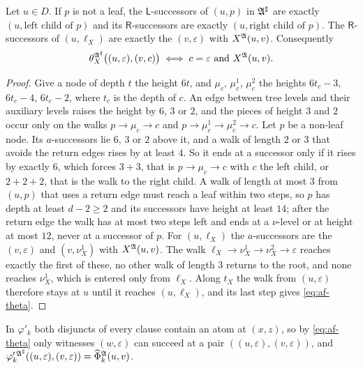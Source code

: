 \begin{lemma}\label{lem:af-steps}
Let $u\in D$. If $p$ is not a leaf, the $\mathsf L$-successors of $(u,p)$ in
$\mathfrak A^\sharp$ are exactly $(u,\text{left child of }p)$ and its
$\mathsf R$-successors are exactly $(u,\text{right child of }p)$. The
$\mathsf R$-successors of $(u,\ell_X)$ are exactly the $(v,\varepsilon)$ with
$X^{\mathfrak A}(u,v)$. Consequently
\begin{equation}\label{eq:af-theta}
 \theta_X^{\mathfrak A^\sharp}\bigl((u,\varepsilon),(v,c)\bigr)\iff c=\varepsilon\
 \text{and}\ X^{\mathfrak A}(u,v).
\end{equation}
\end{lemma}
\begin{proof}
Give a node of depth $t$ the height $6t$, and $\mu_c$, $\mu^1_c$,
$\mu^2_c$ the heights $6t_c-3$, $6t_c-4$, $6t_c-2$, where $t_c$ is the
depth of $c$. An edge between tree levels and their auxiliary levels
raises the height by $6$, $3$ or $2$, and the pieces of height $3$ and $2$
occur only on the walks $p\to\mu_c\to c$ and
$p\to\mu^1_c\to\mu^2_c\to c$. Let $p$ be a non-leaf node. Its
$a$-successors lie $6$, $3$ or $2$ above it, and a walk of length $2$ or
$3$ that avoids the return edges rises by at least $4$. So it ends at a
successor only if it rises by exactly $6$, which forces $3+3$, that is
$p\to\mu_c\to c$ with $c$ the left child, or $2+2+2$, that is the walk to
the right child. A walk of length at most $3$ from $(u,p)$ that uses a
return edge must reach a leaf within two steps, so $p$ has depth at least
$d-2\ge2$ and its successors have height at least $14$; after the return
edge the walk has at most two steps left and ends at a $\nu$-level or at
height at most $12$, never at a successor of $p$. For $(u,\ell_X)$ the
$a$-successors are the $(v,\varepsilon)$ and $(v,\nu^1_X)$ with
$X^{\mathfrak A}(u,v)$. The walk $\ell_X\to\nu^1_X\to\nu^2_X\to\varepsilon$ reaches exactly the first of these,
no other walk of length $3$ returns to the root, and none reaches
$\nu^1_X$, which is entered only from $\ell_X$. Along $t_X$ the walk from
$(u,\varepsilon)$ therefore stays at $u$ until it reaches $(u,\ell_X)$, and its last
step gives \eqref{eq:af-theta}.
\end{proof}
In $\varphi'_k$ both disjuncts of every clause contain an atom at $(x,z)$,
so by \eqref{eq:af-theta} only witnesses $(w,\varepsilon)$ can succeed at a
pair $((u,\varepsilon),(v,\varepsilon))$, and
$\varphi'^{\,\mathfrak A^\sharp}_k((u,\varepsilon),(v,\varepsilon))=\widehat\Phi_k^{\mathfrak A}(u,v)$.


